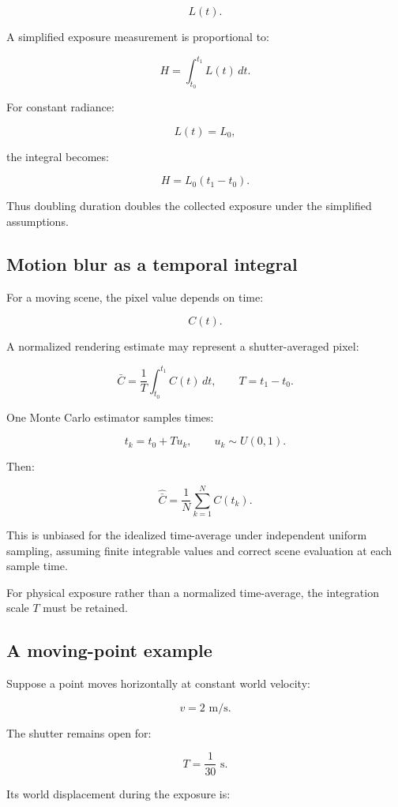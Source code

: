 \[ L(t). \]

A simplified exposure measurement is proportional to:

\[ \boxed{ H=\int_{t_0}^{t_1}L(t)\,dt. } \]

For constant radiance:

\[ L(t)=L_0, \]

the integral becomes:

\[ \boxed{ H=L_0(t_1-t_0). } \]

Thus doubling duration doubles the collected exposure under the simplified assumptions.

\subsection{Motion blur as a temporal integral}\label{02-foundations-ii-ch036-motion-blur-as-a-temporal-integral}

For a moving scene, the pixel value depends on time:

\[ C(t). \]

A normalized rendering estimate may represent a shutter-averaged pixel:

\[ \boxed{ \bar C= \frac1T\int_{t_0}^{t_1}C(t)\,dt, \qquad T=t_1-t_0. } \]

One Monte Carlo estimator samples times:

\[ t_k=t_0+Tu_k, \qquad u_k\sim U(0,1). \]

Then:

\[ \boxed{ \widehat{\bar C} = \frac1N\sum_{k=1}^{N}C(t_k). } \]

This is unbiased for the idealized time-average under independent uniform sampling, assuming finite integrable values and correct scene evaluation at each sample time.

For physical exposure rather than a normalized time-average, the integration scale \(T\) must be retained.

\subsection{A moving-point example}\label{02-foundations-ii-ch036-a-moving-point-example}

Suppose a point moves horizontally at constant world velocity:

\[ v=2\text{ m/s}. \]

The shutter remains open for:

\[ T=\frac1{30}\text{ s}. \]

Its world displacement during the exposure is:

